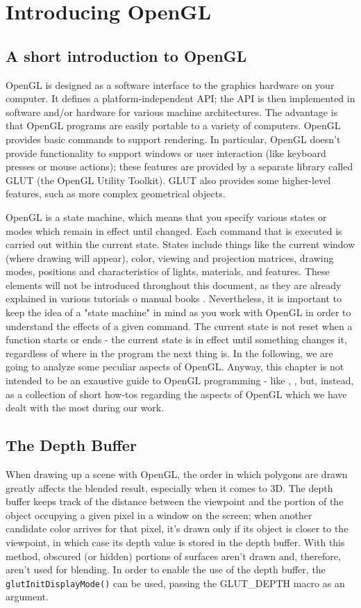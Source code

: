\section{Introducing OpenGL}
\label{sec:opengl}
\lstset{language=C++}
\subsection{A short introduction to OpenGL}
OpenGL is designed as a software interface to the graphics 
hardware on your computer. It defines a platform-independent API;
the API is then implemented in software and/or hardware for 
various machine architectures. The advantage is that OpenGL 
programs are easily portable to a variety of computers. 
OpenGL provides basic commands to support rendering. 
In particular, OpenGL doesn't provide functionality to support
windows or user interaction (like keyboard presses or mouse 
actions); these features are provided by a separate library called
GLUT (the OpenGL Utility Toolkit). GLUT also provides some 
higher-level features, such as more complex geometrical objects.
%

%
OpenGL is a state machine, which means that you specify various 
states or modes which remain in effect until changed.
Each command that is executed is carried out within the current 
state. States include things like the current window (where
drawing will appear), color, viewing and projection matrices, 
drawing modes, positions and characteristics of lights,
materials, and features. These elements will not be introduced 
throughout this document, as they are already explained in
various tutorials \cite{opengl:brieftutorial} o manual books 
\cite{opengl:redbook}.
%
Nevertheless, it is important to keep the idea of a 
"state machine" in mind as you work with OpenGL in order to 
understand the effects of a given command. The current state 
is not reset when a function starts or ends - the current state
is in effect until something changes it, regardless of where 
in the program the next thing is. 
%
In the following, we are going to analyze some peculiar 
aspects of OpenGL. Anyway, this chapter is not intended 
to be an exaustive guide to OpenGL programming 
- like \cite{opengl:distilled}, \cite{opengl:redbook}, but,
instead, as a collection of short how-tos regarding the 
aspects of OpenGL which we have dealt with the most 
during our work. 
%
\subsection{The Depth Buffer}
When drawing up a scene with OpenGL, the order in which polygons are drawn
greatly affects the blended result, especially when it comes to 3D.
%
The depth buffer keeps track of the distance between the viewpoint and 
the portion of the object occupying a given pixel in a window on the 
screen; when another candidate color arrives for that pixel, it's drawn 
only if its object is closer to the viewpoint, in which case its depth
value is stored in the depth buffer. With this method, obscured (or hidden)
portions of surfaces aren't drawn and, therefore, aren't used for
blending.
%
In order to enable the use of the depth buffer, the 
\texttt{glutInitDisplayMode()} can be used, passing the 
GLUT\_DEPTH macro as an argument.
%

